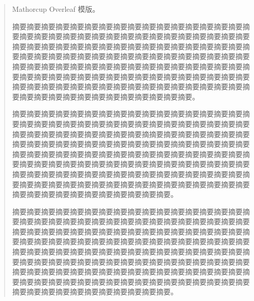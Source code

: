 \documentclass{MMCStyle}
\begin{document}
	\begin{abstract}
		Mathorcup\cite{石润2014我国区域金融风险的防范与化解策略研究} Overleaf 模版\cite{AAAAAA}。
        
 
        摘要摘要摘要摘要摘要摘要摘要摘要摘要摘要摘要摘要摘要摘要摘要摘要摘要摘要摘要摘要摘要摘要摘要摘要摘要摘要摘要摘要摘要摘要摘要摘要摘要摘要摘要摘要摘要摘要摘要摘要摘要摘要摘要摘要摘要摘要摘要摘要摘要摘要摘要摘要摘要摘要摘要摘要摘要摘要摘要摘要摘要摘要摘要摘要摘要摘要摘要摘要摘要摘要摘要摘要摘要摘要摘要摘要摘要摘要摘要摘要摘要摘要摘要摘要摘要摘要摘要摘要摘要摘要摘要摘要摘要摘要摘要摘要摘要摘要摘要摘要摘要摘要摘要摘要摘要摘要摘要摘要摘要摘要摘要摘要摘要摘要摘要摘要摘要摘要摘要摘要摘要摘要摘要摘要摘要摘要摘要摘要。
        
        摘要摘要摘要摘要摘要摘要摘要摘要摘要摘要摘要摘要摘要摘要摘要摘要摘要摘要摘要摘要摘要摘要摘要摘要摘要摘要摘要摘要摘要摘要摘要摘要摘要摘要摘要摘要摘要摘要摘要摘要摘要摘要摘摘要摘要摘要摘要摘要摘要摘要摘要摘要摘要摘要摘要摘要摘要摘要摘要摘要摘要摘摘要摘要摘要摘要摘要摘要摘要摘要摘要摘要摘要摘要摘要摘要摘要摘要摘要摘要摘要摘要摘要摘要摘要摘要摘要摘要摘要摘要摘要摘要摘要摘要摘要摘要摘要摘要摘要摘要摘要摘要摘要摘要摘要摘要摘要摘要摘要摘要摘要摘要摘要摘要摘要摘要摘要摘要摘要摘要摘要摘要摘要摘要摘要摘要摘要摘要摘要摘要摘要摘要摘要摘要摘要摘要摘要摘要摘要摘要摘要摘要摘要摘要。

        摘要摘要摘要摘要摘要摘要摘要摘要摘要摘要摘要摘要摘要摘要摘要摘要摘要摘要摘要摘要摘要摘要摘要摘要摘要摘要摘要摘要摘要摘要摘要摘要摘要摘要摘要摘要摘要摘要摘要摘要摘要摘要摘要摘要摘要摘要摘要摘要摘要摘要摘要摘要摘要摘要摘要摘要摘要摘要摘要摘要摘要摘要摘要摘要摘要摘要摘要摘要摘要摘要摘要摘要摘要摘要摘要摘要摘要摘要摘要摘要摘要摘要摘要摘要摘要摘要摘要摘要摘要摘要摘要摘要摘要摘要摘要摘要摘要摘要摘要摘要摘要摘要摘要摘要摘要摘要摘要摘要摘要摘要摘要摘要摘要摘要摘要摘要摘要摘要摘要摘要摘要摘要摘要摘要摘要摘要摘要摘要摘要摘要摘要摘要摘要摘要摘要摘要摘要摘要摘要摘要摘要摘要摘要。
	\end{abstract}
\end{document}
